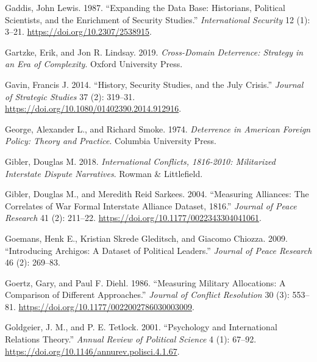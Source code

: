 \documentclass{article}
\newlength{\cslhangindent}
\newlength{\cslentryspacingunit} %
\newenvironment{CSLReferences}[2] %
 {%
  \setlength{\parindent}{0pt}
  \ifodd #1
  \let\oldpar\par
  \def\par{\hangindent=\cslhangindent\oldpar}
  \fi
  \setlength{\parskip}{#2\cslentryspacingunit}
 }%
 {}
\begin{document}
\begin{CSLReferences}{1}{0}
\leavevmode{}%
Gaddis, John Lewis. 1987. {``Expanding the {Data Base}: {Historians},
{Political Scientists}, and the {Enrichment} of {Security Studies}.''}
\emph{International Security} 12 (1): 3--21.
\url{https://doi.org/10.2307/2538915}.

\leavevmode{}%
Gartzke, Erik, and Jon R. Lindsay. 2019. \emph{Cross-{Domain
Deterrence}: {Strategy} in an {Era} of {Complexity}}. {Oxford University
Press}.

\leavevmode{}%
Gavin, Francis J. 2014. {``History, {Security Studies}, and the {July
Crisis}.''} \emph{Journal of Strategic Studies} 37 (2): 319--31.
\url{https://doi.org/10.1080/01402390.2014.912916}.

\leavevmode{}%
George, Alexander L., and Richard Smoke. 1974. \emph{Deterrence in
{American} Foreign Policy: {Theory} and Practice}. {Columbia University
Press}.

\leavevmode{}%
Gibler, Douglas M. 2018. \emph{International {Conflicts}, 1816-2010:
{Militarized Interstate Dispute Narratives}}. {Rowman \& Littlefield}.

\leavevmode{}%
Gibler, Douglas M., and Meredith Reid Sarkees. 2004. {``Measuring
{Alliances}: The {Correlates} of {War Formal Interstate Alliance}
{Dataset}, 1816.''} \emph{Journal of Peace Research} 41
(2): 211--22. \url{https://doi.org/10.1177/0022343304041061}.

\leavevmode{}%
Goemans, Henk E., Kristian Skrede Gleditsch, and Giacomo Chiozza. 2009.
{``Introducing {Archigos}: {A} Dataset of Political Leaders.''}
\emph{Journal of Peace Research} 46 (2): 269--83.

\leavevmode{}%
Goertz, Gary, and Paul F. Diehl. 1986. {``Measuring {Military
Allocations}: {A Comparison} of {Different Approaches}.''} \emph{Journal
of Conflict Resolution} 30 (3): 553--81.
\url{https://doi.org/10.1177/0022002786030003009}.

\leavevmode{}%
Goldgeier, J. M., and P. E. Tetlock. 2001. {``Psychology and
{International Relations Theory}.''} \emph{Annual Review of Political
Science} 4 (1): 67--92.
\url{https://doi.org/10.1146/annurev.polisci.4.1.67}.


\end{CSLReferences}
\end{document}
